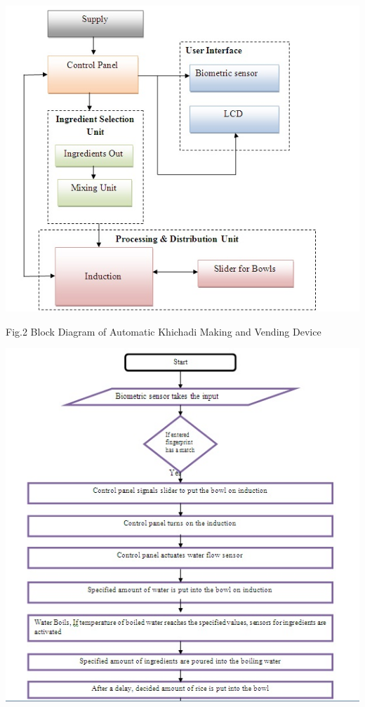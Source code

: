 \documentclass{article}
\begin{document}
\begin{center}\includegraphics[scale=0.8]{block1082}\end{center}
\begin{center}Fig.2 Block Diagram of Automatic Khichadi Making and Vending Device\end{center}
\begin{center}\includegraphics[scale=0.8]{flow1}\end{center}
\end{document}
